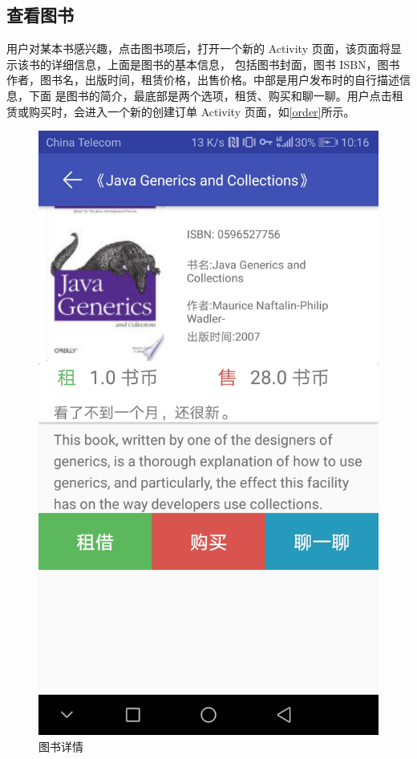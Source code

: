 \subsection{查看图书}

用户对某本书感兴趣，点击图书项后，打开一个新的 Activity 页面，该页面将显示该书的详细信息，上面是图书的基本信息，
包括图书封面，图书 ISBN，图书作者，图书名，出版时间，租赁价格，出售价格。中部是用户发布时的自行描述信息，下面
是图书的简介，最底部是两个选项，租赁、购买和聊一聊。用户点击租赁或购买时，会进入一个新的创建订单 Activity 页面，如\cref{order}所示。

\begin{figure}[h]
	\centering
	\includegraphics[scale=0.09]{Chapters/UI/ubook_info.jpg}
	\caption{图书详情}
	\label{ubook_info}
\end{figure}

